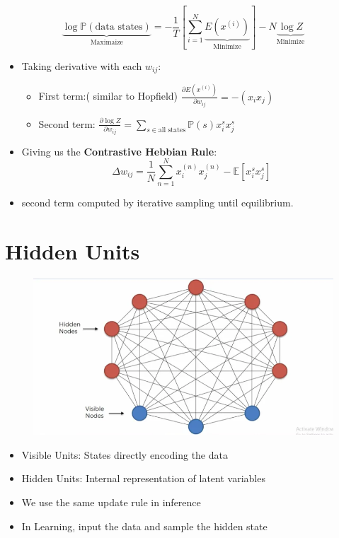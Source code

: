 \documentclass{antclass}
\begin{document}
\[
\underbrace{ \log \mathbb{P}(\text{data states}) }_{\text{Maximaize}} = -\frac{1}{T}[\sum_{i=1}^{N} \underbrace{E(x^{(i)})}_{\text{Minimize}} ]  - N \underbrace{ \log Z}_{\text{Minimize}}
\]

\begin{itemize}
\item Taking derivative with each \(w_{ij}\):
\begin{itemize}
	\item First term:( similar to Hopfield) \(\frac{\partial E(x^{(i)}) }{\partial w_{ij}} = -(x_ix_j)\)
	\item Second term: \(\frac{\partial \log Z}{\partial w_{ij}} = \sum_{s \in \text{all states}} \mathbb{P}(s)x_i^s x_j^s\)
\end{itemize}
\item Giving us the \textbf{Contrastive Hebbian Rule}:
\[
\Delta w_{ij} = \frac{1}{N} \sum_{n=1}^{N} x^{(n)}_ix^{(n)}_j - \mathbb{E}[ x_i^sx_j^s]
\]
\item second term computed by iterative sampling until equilibrium.
\end{itemize}


\section{Hidden Units}

\begin{figure}
	\centering
	\includegraphics[width=0.8\linewidth]{pics/BM/BM.png}
	\label{fig:bm-structure}
\end{figure}

\begin{itemize}

\item Visible Units: States directly encoding the data
\item Hidden Units: Internal representation of latent variables
\item We use the same update rule in inference
\item In Learning, input the data and sample the hidden state
\end{itemize}
\end{document}

